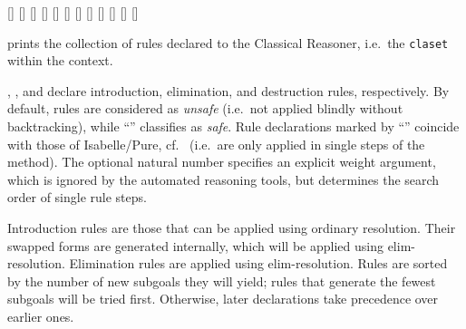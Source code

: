 \begin{isabellebody}
\begin{isamarkuptext}
  \begin{railoutput}
\rail@bar
{}[]
[]
[]
\rail@endbar
\rail@bar
{}[]
[]
\rail@endbar
\rail@bar
{}
[]
\rail@endbar
\rail@end
{}
[]
[]
\rail@end
{}
[]
\rail@bar
\rail@bar
{}
[]
\rail@endbar
\rail@bar
{}
[]
\rail@endbar
{}
[]
\rail@endbar
\rail@end
\end{railoutput}


  \begin{description}

  \item \hyperlink{command.print-claset}{\mbox{}} prints the collection of rules
  declared to the Classical Reasoner, i.e.\ the \verb|claset|
  within the context.

  \item \hyperlink{attribute.intro}{\mbox{}}, \hyperlink{attribute.elim}{\mbox{}}, and \hyperlink{attribute.dest}{\mbox{}}
  declare introduction, elimination, and destruction rules,
  respectively.  By default, rules are considered as \emph{unsafe}
  (i.e.\ not applied blindly without backtracking), while ``'' classifies as \emph{safe}.  Rule declarations marked by
  ``'' coincide with those of Isabelle/Pure, cf.\
   (i.e.\ are only applied in single steps
  of the \hyperlink{method.rule}{\mbox{\isa{rule}}} method).  The optional natural number
  specifies an explicit weight argument, which is ignored by the
  automated reasoning tools, but determines the search order of single
  rule steps.

  Introduction rules are those that can be applied using ordinary
  resolution.  Their swapped forms are generated internally, which
  will be applied using elim-resolution.  Elimination rules are
  applied using elim-resolution.  Rules are sorted by the number of
  new subgoals they will yield; rules that generate the fewest
  subgoals will be tried first.  Otherwise, later declarations take
  precedence over earlier ones.


\end{description}
\end{isamarkuptext}
\end{isabellebody}
